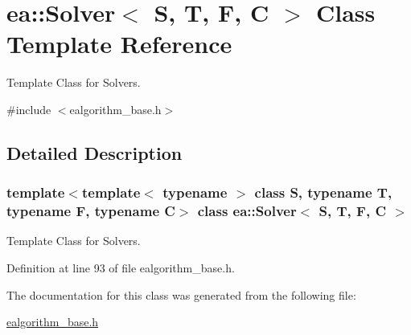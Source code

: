 \hypertarget{classea_1_1_solver}{}\section{ea\+:\+:Solver$<$ S, T, F, C $>$ Class Template Reference}
\label{classea_1_1_solver}


Template Class for Solvers.  




{\ttfamily \#include $<$ealgorithm\+\_\+base.\+h$>$}



\subsection{Detailed Description}
\subsubsection*{template$<$template$<$ typename $>$ class S, typename T, typename F, typename C$>$\newline
class ea\+::\+Solver$<$ S, T, F, C $>$}

Template Class for Solvers. 

Definition at line 93 of file ealgorithm\+\_\+base.\+h.



The documentation for this class was generated from the following file\+:\begin{DoxyCompactItemize}
\item 
\hyperlink{ealgorithm__base_8h}{ealgorithm\+\_\+base.\+h}\end{DoxyCompactItemize}
